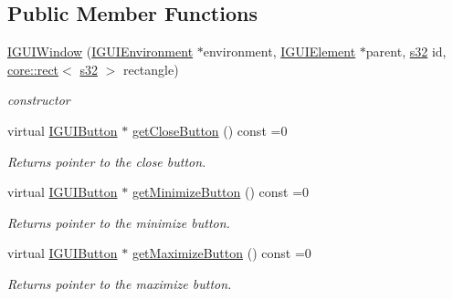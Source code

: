 \subsection*{Public Member Functions}
\begin{DoxyCompactItemize}
\item 
\mbox{\label{classirr_1_1gui_1_1IGUIWindow_a964282be17981b8287b0a85d65a4008d}} 
\hyperlink{classirr_1_1gui_1_1IGUIWindow_a964282be17981b8287b0a85d65a4008d}{I\+G\+U\+I\+Window} (\hyperlink{classirr_1_1gui_1_1IGUIEnvironment}{I\+G\+U\+I\+Environment} $\ast$environment, \hyperlink{classirr_1_1gui_1_1IGUIElement}{I\+G\+U\+I\+Element} $\ast$parent, \hyperlink{namespaceirr_ac66849b7a6ed16e30ebede579f9b47c6}{s32} id, \hyperlink{classirr_1_1core_1_1rect}{core\+::rect}$<$ \hyperlink{namespaceirr_ac66849b7a6ed16e30ebede579f9b47c6}{s32} $>$ rectangle)
\begin{DoxyCompactList}\small\item\em constructor \end{DoxyCompactList}\item 
virtual \hyperlink{classirr_1_1gui_1_1IGUIButton}{I\+G\+U\+I\+Button} $\ast$ \hyperlink{classirr_1_1gui_1_1IGUIWindow_ae5b6abf3c9d8d0af5539adf3fea8db70}{get\+Close\+Button} () const =0
\begin{DoxyCompactList}\small\item\em Returns pointer to the close button. \end{DoxyCompactList}\item 
virtual \hyperlink{classirr_1_1gui_1_1IGUIButton}{I\+G\+U\+I\+Button} $\ast$ \hyperlink{classirr_1_1gui_1_1IGUIWindow_a9c9b5060ca57c46bfece1339ef30facb}{get\+Minimize\+Button} () const =0
\begin{DoxyCompactList}\small\item\em Returns pointer to the minimize button. \end{DoxyCompactList}\item 
virtual \hyperlink{classirr_1_1gui_1_1IGUIButton}{I\+G\+U\+I\+Button} $\ast$ \hyperlink{classirr_1_1gui_1_1IGUIWindow_a7b5976907664ed8603f3a603079d3b15}{get\+Maximize\+Button} () const =0
\begin{DoxyCompactList}\small\item\em Returns pointer to the maximize button. \end{DoxyCompactList}\item 
\mbox{\label{classirr_1_1gui_1_1IGUIWindow_a466621df62d0dd97eb008efd3d31d4d9}} 

\end{DoxyCompactItemize}
